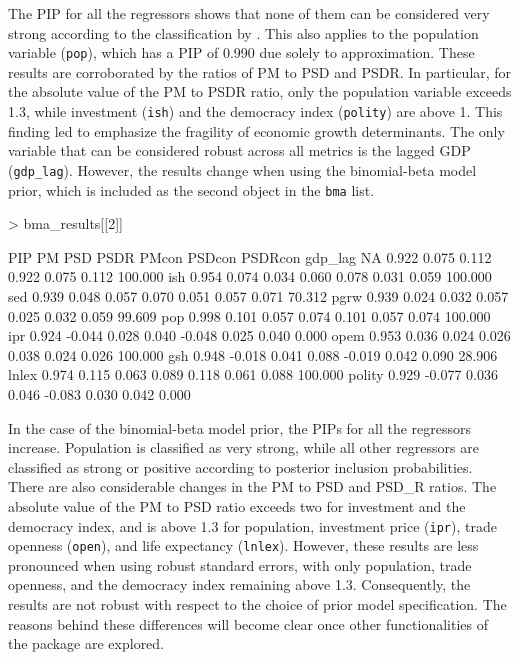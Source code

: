 \documentclass[a4paper]{article}
\begin{document}
The PIP for all the regressors shows that none of them can be considered very strong according to the classification by \citet{Raftery+1995}.
This also applies to the population variable (\verb+pop+), which has a PIP of 0.990 due solely to approximation.
These results are corroborated by the ratios of PM to PSD and PSDR.
In particular, for the absolute value of the PM to PSDR ratio, only the population variable exceeds 1.3, while investment (\verb+ish+) and the democracy index (\verb+polity+) are above 1.
This finding led \citet{Moral+2016} to emphasize the fragility of economic growth determinants.
The only variable that can be considered robust across all metrics is the lagged GDP (\verb+gdp_lag+).
However, the results change when using the binomial-beta model prior, which is included as the second object in the \verb+bma+ list.
\begin{Schunk}
\begin{Sinput}
> bma_results[[2]]
\end{Sinput}
\begin{Soutput}
          PIP     PM   PSD  PSDR  PMcon PSDcon PSDRcon    %
gdp_lag    NA  0.922 0.075 0.112  0.922  0.075   0.112 100.000
ish     0.954  0.074 0.034 0.060  0.078  0.031   0.059 100.000
sed     0.939  0.048 0.057 0.070  0.051  0.057   0.071  70.312
pgrw    0.939  0.024 0.032 0.057  0.025  0.032   0.059  99.609
pop     0.998  0.101 0.057 0.074  0.101  0.057   0.074 100.000
ipr     0.924 -0.044 0.028 0.040 -0.048  0.025   0.040   0.000
opem    0.953  0.036 0.024 0.026  0.038  0.024   0.026 100.000
gsh     0.948 -0.018 0.041 0.088 -0.019  0.042   0.090  28.906
lnlex   0.974  0.115 0.063 0.089  0.118  0.061   0.088 100.000
polity  0.929 -0.077 0.036 0.046 -0.083  0.030   0.042   0.000
\end{Soutput}
\end{Schunk}

In the case of the binomial-beta model prior, the PIPs for all the regressors increase.
Population is classified as very strong, while all other regressors are classified as strong or positive according to posterior inclusion probabilities.
There are also considerable changes in the PM to PSD and PSD\_R ratios.
The absolute value of the PM to PSD ratio exceeds two for investment and the democracy index, and is above 1.3 for population, investment price (\verb+ipr+), trade openness (\verb+open+), and life expectancy (\verb+lnlex+).
However, these results are less pronounced when using robust standard errors, with only population, trade openness, and the democracy index remaining above 1.3.
Consequently, the results are not robust with respect to the choice of prior model specification.
The reasons behind these differences will become clear once other functionalities of the package are explored.
\end{document}
